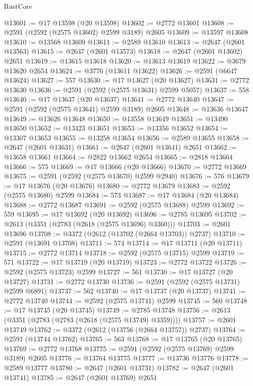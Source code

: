 \begin{lexlean}{RustCore}
\begin{coremodule}
@13601 := @17 @13598 (@20 @13598)
@13602 := @2772 @13601
@13608 := @2591 (@2592 (@2575 @13602) @2599 @3189) @2605
@13609 := @13597 @13608
@13610 := @13568 @13609
@13611 := @2589 @13610
@13613 := @2647 (@2601 @13563)
@13615 := @2647 (@2601 @13573)
@13618 := @2647 (@2601 @13602) @2651
@13619 := @13615 @13618
@13620 := @13613 @13619
@13622 := @3679 @13620 @2654
@13624 := @3776 (@13611 @13622)
@13626 := @2591 (@6647 @13624)
@13627 := 557
@13630 := @17 @13627 (@20 @13627)
@13631 := @2772 @13630
@13636 := @2591 (@2592 (@2575 @13631) @2599 @5057)
@13637 := 558
@13640 := @17 @13637 (@20 @13637)
@13641 := @2772 @13640
@13647 := @2591 (@2592 (@2575 @13641) @2599 @3189) @2605
@13648 := @13636 @13647
@13649 := @13626 @13648
@13650 := @13558 @13649
@13651 := @13490 @13650
@13652 := @13423 @13651
@13653 := @13356 @13652
@13654 := @13307 @13653
@13655 := @13258 @13654
@13656 := @2589 @13655
@13658 := @2647 (@2601 @13631)
@13661 := @2647 (@2601 @13641) @2651
@13662 := @13658 @13661
@13664 := @2822 @13662 @2654
@13665 := @2818 @13664
@13666 := 575
@13669 := @17 @13666 (@20 @13666)
@13670 := @2772 @13669
@13675 := @2591 (@2592 (@2575 @13670) @2599 @2940)
@13676 := 576
@13679 := @17 @13676 (@20 @13676)
@13680 := @2772 @13679
@13683 := @2592 (@2575 @13680) @2599
@13684 := 573
@13687 := @17 @13684 (@20 @13684)
@13688 := @2772 @13687
@13691 := @2592 (@2575 @13688) @2599
@13692 := 559
@13695 := @17 @13692 (@20 @13692)
@13696 := @2785 @13695
@13702 := @2613 (@3351 (@2783 (@2618 (@2575 @13696) @3360)))
@13703 := @2601 @13696
@13708 := @3372 (@2612 (@13702 (@2664 @13703)) @2737)
@13710 := @2591 (@13691 @13708)
@13711 := 574
@13714 := @17 @13711 (@20 @13711)
@13715 := @2772 @13714
@13718 := @2592 (@2575 @13715) @2599
@13719 := 571
@13722 := @17 @13719 (@20 @13719)
@13723 := @2772 @13722
@13726 := @2592 (@2575 @13723) @2599
@13727 := 561
@13730 := @17 @13727 (@20 @13727)
@13731 := @2772 @13730
@13736 := @2591 (@2592 (@2575 @13731) @2599 @6891)
@13737 := 562
@13740 := @17 @13737 (@20 @13737)
@13741 := @2772 @13740
@13744 := @2592 (@2575 @13741) @2599
@13745 := 560
@13748 := @17 @13745 (@20 @13745)
@13749 := @2785 @13748
@13756 := @2613 (@3351 (@2783 (@2783 (@2618 (@2575 @13749) @3359))))
@13757 := @2601 @13749
@13762 := @3372 (@2612 (@13756 (@2664 @13757)) @2737)
@13764 := @2591 (@13744 @13762)
@13765 := 563
@13768 := @17 @13765 (@20 @13765)
@13769 := @2772 @13768
@13775 := @2591 (@2592 (@2575 @13769) @2599 @3189) @2605
@13776 := @13764 @13775
@13777 := @13736 @13776
@13778 := @2589 @13777
@13780 := @2647 (@2601 @13731)
@13782 := @2647 (@2601 @13741)
@13785 := @2647 (@2601 @13769) @2651

\end{coremodule}
\end{lexlean}
